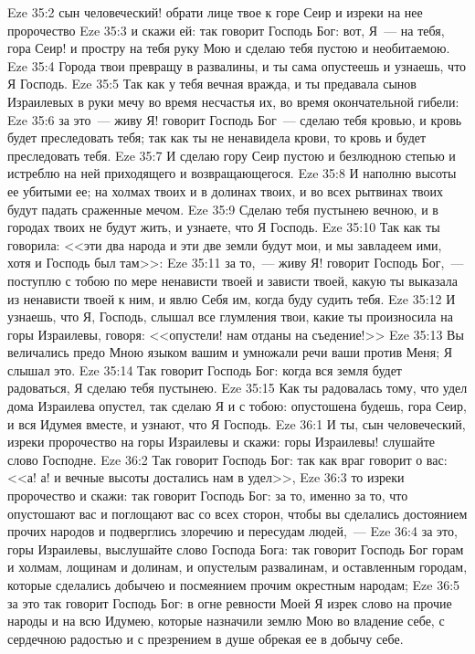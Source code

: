 \vs Eze 35:2 сын человеческий! обрати лице твое к горе Сеир и изреки на нее пророчество
\vs Eze 35:3 и скажи ей: так говорит Господь Бог: вот, Я~--- на тебя, гора Сеир! и простру на тебя руку Мою и сделаю тебя пустою и необитаемою.
\vs Eze 35:4 Города твои превращу в развалины, и ты сама опустеешь и узнаешь, что Я Господь.
\vs Eze 35:5 Так как у тебя вечная вражда, и ты предавала сынов Израилевых в руки мечу во время несчастья их, во время окончательной гибели:
\vs Eze 35:6 за это~--- живу Я! говорит Господь Бог~--- сделаю тебя кровью, и кровь будет преследовать тебя; так как ты не ненавидела крови, то кровь и будет преследовать тебя.
\vs Eze 35:7 И сделаю гору Сеир пустою и безлюдною степью и истреблю на ней приходящего и возвращающегося.
\vs Eze 35:8 И наполню высоты ее убитыми ее; на холмах твоих и в долинах твоих, и во всех рытвинах твоих будут падать сраженные мечом.
\vs Eze 35:9 Сделаю тебя пустынею вечною, и в городах твоих не будут жить, и узнаете, что Я Господь.
\vs Eze 35:10 Так как ты говорила: <<эти два народа и эти две земли будут мои, и мы завладеем ими, хотя и Господь был там>>:
\vs Eze 35:11 за то,~--- живу Я! говорит Господь Бог,~--- поступлю с тобою по мере ненависти твоей и зависти твоей, какую ты выказала из ненависти твоей к ним, и явлю Себя им, когда буду судить тебя.
\vs Eze 35:12 И узнаешь, что Я, Господь, слышал все глумления твои, какие ты произносила на горы Израилевы, говоря: <<опустели! нам отданы на съедение!>>
\vs Eze 35:13 Вы величались предо Мною языком вашим и умножали речи ваши против Меня; Я слышал это.
\vs Eze 35:14 Так говорит Господь Бог: когда вся земля будет радоваться, Я сделаю тебя пустынею.
\vs Eze 35:15 Как ты радовалась тому, что удел дома Израилева опустел, так сделаю Я и с тобою: опустошена будешь, гора Сеир, и вся Идумея вместе, и узнают, что Я Господь.
\vs Eze 36:1 И ты, сын человеческий, изреки пророчество на горы Израилевы и скажи: горы Израилевы! слушайте слово Господне.
\vs Eze 36:2 Так говорит Господь Бог: так как враг говорит о вас: <<а! а! и вечные высоты достались нам в удел>>,
\vs Eze 36:3 то изреки пророчество и скажи: так говорит Господь Бог: за то, именно за то, что опустошают вас и поглощают вас со всех сторон, чтобы вы сделались достоянием прочих народов и подверглись злоречию и пересудам людей,~---
\vs Eze 36:4 за это, горы Израилевы, выслушайте слово Господа Бога: так говорит Господь Бог горам и холмам, лощинам и долинам, и опустелым развалинам, и оставленным городам, которые сделались добычею и посмеянием прочим окрестным народам;
\vs Eze 36:5 за это так говорит Господь Бог: в огне ревности Моей Я изрек слово на прочие народы и на всю Идумею, которые назначили землю Мою во владение себе, с сердечною радостью и с презрением в душе обрекая ее в добычу себе.
